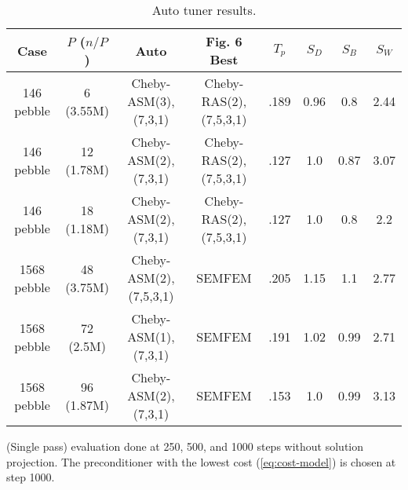 \begin{table*}
\centering
\begin{subtable}{\textwidth}\centering
\begin{tabular}{||c|| c| c| c| c| c| c| c||}
  \hline
  Case & $P$ ($n/P$) & Auto & Fig. 6 Best & $T_p$ & $S_D$ & $S_B$ & $S_W$\\
  \hline\hline
  146 pebble  & 6  (3.55M) & Cheby-ASM(3),(7,3,1)   & Cheby-RAS(2),(7,5,3,1) & .189 & 0.96 & 0.8    & 2.44\\
  146 pebble  & 12 (1.78M) & Cheby-ASM(2),(7,3,1)   & Cheby-RAS(2),(7,5,3,1) & .127 & 1.0  & 0.87   & 3.07\\
  146 pebble  & 18 (1.18M) & Cheby-ASM(2),(7,3,1)   & Cheby-RAS(2),(7,5,3,1) & .127 & 1.0  & 0.8    & 2.2\\
  \hline
  1568 pebble & 48 (3.75M) & Cheby-ASM(2),(7,5,3,1) & SEMFEM                & .205 & 1.15 & 1.1    & 2.77\\
  1568 pebble & 72 (2.5M)  & Cheby-ASM(1),(7,3,1)   & SEMFEM                & .191 & 1.02 & 0.99   & 2.71\\
  1568 pebble & 96 (1.87M) & Cheby-ASM(2),(7,3,1)   & SEMFEM                & .153 & 1.0  & 0.99   & 3.13\\
\hline
\end{tabular}
\caption{\small (Single pass) evaluation done at 250, 500, and 1000 steps without solution projection.
The preconditioner with the lowest cost (\ref{eq:cost-model}) is chosen at step 1000.
\label{table:auto-multi-step}}
\end{subtable}

\caption{
  \small
  Auto tuner results.
  \label{table:auto-preco}}
\end{table*}
